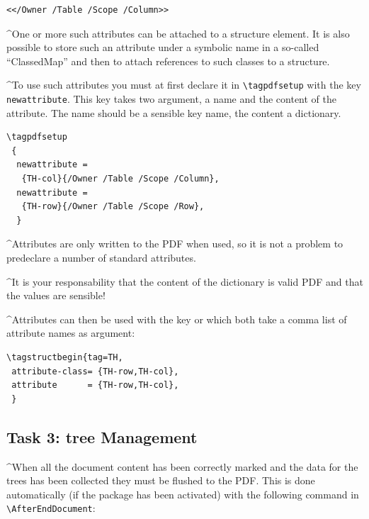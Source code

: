 \documentclass[DIV=12,parskip=half-,bibliography=totoc]{scrartcl}
\newcommand\PDF{PDF}
\begin{document}
\begin{lstlisting}
<</Owner /Table /Scope /Column>>
\end{lstlisting}
\tagmcend\tagstructend

\TagP^One or more such attributes can be attached to a structure element. It is also possible to store such an attribute under a symbolic name in a so-called \enquote{ClassedMap} and then to attach references to such classes to a structure.\TagPend

\TagP^To use such attributes you must at first declare it in \verb+\tagpdfsetup+ with the key \texttt{newattribute}. This key takes two argument, a name and the content of the attribute.
The name should be a sensible key name, the content a dictionary.
\TagPend

\begin{lstlisting}
\tagpdfsetup
 {
  newattribute =
   {TH-col}{/Owner /Table /Scope /Column},
  newattribute =
   {TH-row}{/Owner /Table /Scope /Row},
  }
\end{lstlisting}
\tagmcend\tagstructend


\TagP^Attributes are only written to the \PDF{} when used, so it is not a problem to predeclare a number of standard attributes.
\TagPend

\TagP^It is your responsability that the content of the dictionary is valid \PDF{} and that the values are sensible!
\TagPend

\TagP^Attributes can then be used with the key  or  which both take a comma list of attribute names as argument:
\TagPend

\begin{lstlisting}
\tagstructbegin{tag=TH,
 attribute-class= {TH-row,TH-col},
 attribute      = {TH-row,TH-col},
 }
\end{lstlisting}
\tagmcend\tagstructend


\subsection{Task 3: tree Management}
\TagP^When all the document content has been correctly marked and the data for the trees has been collected they must be flushed to the \PDF{}. This is done automatically (if the package has been activated) with the following command in \verb+\AfterEndDocument+:\TagPend
\end{document}
